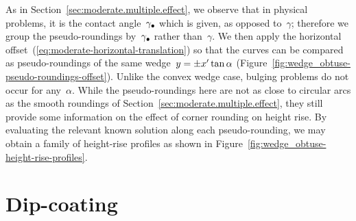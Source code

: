 As in Section~\ref{sec:moderate.multiple.effect},
we observe that in physical problems,
it is the contact angle~$\gamma_\bullet$ which is given,
as opposed to~$\gamma$;
therefore we group the pseudo-roundings by~$\gamma_\bullet$
rather than~$\gamma$.
We then apply the horizontal offset~(\ref{eq:moderate-horizontal-translation})
so that the curves can be compared as pseudo-roundings
of the same wedge~$y = \pm x' \tan\alpha$
(Figure~\ref{fig:wedge_obtuse-pseudo-roundings-offset}).
Unlike the convex wedge case,
bulging problems do not occur for any~$\alpha$.
While the pseudo-roundings here are not as close to circular arcs
as the smooth roundings of Section~\ref{sec:moderate.multiple.effect},
they still provide some information
on the effect of corner rounding on height rise.
By evaluating the relevant known solution
along each pseudo-rounding,
we may obtain a family of height-rise profiles
as shown in Figure~\ref{fig:wedge_obtuse-height-rise-profiles}.

\begin{figure}
\end{figure}

\begin{figure}
\end{figure}

\section{Dip-coating}
\label{sec:re-entrant.dip-coating}

